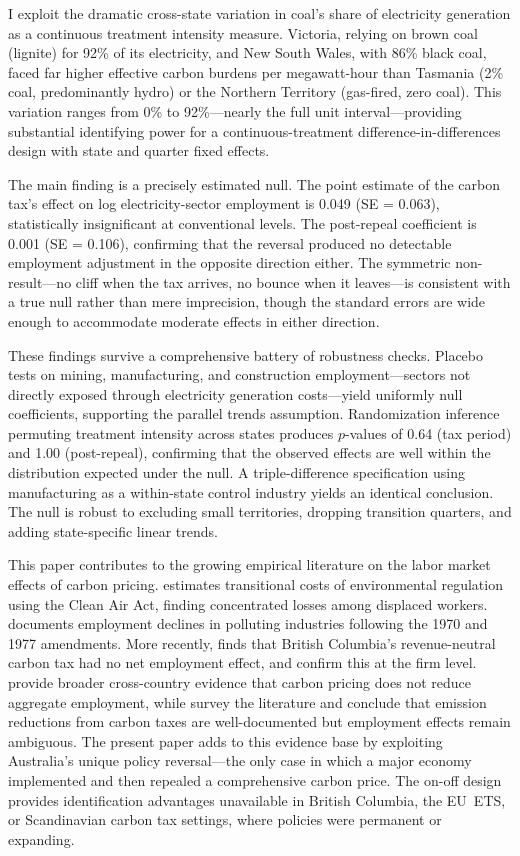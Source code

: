 \documentclass[12pt]{article}
\begin{document}
I exploit the dramatic cross-state variation in coal's share of electricity generation as a continuous treatment intensity measure. Victoria, relying on brown coal (lignite) for 92\% of its electricity, and New South Wales, with 86\% black coal, faced far higher effective carbon burdens per megawatt-hour than Tasmania (2\% coal, predominantly hydro) or the Northern Territory (gas-fired, zero coal). This variation ranges from 0\% to 92\%---nearly the full unit interval---providing substantial identifying power for a continuous-treatment difference-in-differences design with state and quarter fixed effects.

The main finding is a precisely estimated null. The point estimate of the carbon tax's effect on log electricity-sector employment is 0.049 (SE = 0.063), statistically insignificant at conventional levels. The post-repeal coefficient is 0.001 (SE = 0.106), confirming that the reversal produced no detectable employment adjustment in the opposite direction either. The symmetric non-result---no cliff when the tax arrives, no bounce when it leaves---is consistent with a true null rather than mere imprecision, though the standard errors are wide enough to accommodate moderate effects in either direction.

These findings survive a comprehensive battery of robustness checks. Placebo tests on mining, manufacturing, and construction employment---sectors not directly exposed through electricity generation costs---yield uniformly null coefficients, supporting the parallel trends assumption. Randomization inference permuting treatment intensity across states produces $p$-values of 0.64 (tax period) and 1.00 (post-repeal), confirming that the observed effects are well within the distribution expected under the null. A triple-difference specification using manufacturing as a within-state control industry yields an identical conclusion. The null is robust to excluding small territories, dropping transition quarters, and adding state-specific linear trends.

This paper contributes to the growing empirical literature on the labor market effects of carbon pricing. \citet{walker2013transitional} estimates transitional costs of environmental regulation using the Clean Air Act, finding concentrated losses among displaced workers. \citet{greenstone2002impact} documents employment declines in polluting industries following the 1970 and 1977 amendments. More recently, \citet{yamazaki2017jobs} finds that British Columbia's revenue-neutral carbon tax had no net employment effect, and \citet{azevedo2023carbon} confirm this at the firm level. \citet{metcalf2023unequal} provide broader cross-country evidence that carbon pricing does not reduce aggregate employment, while \citet{koppl2023carbon} survey the literature and conclude that emission reductions from carbon taxes are well-documented but employment effects remain ambiguous. The present paper adds to this evidence base by exploiting Australia's unique policy reversal---the only case in which a major economy implemented and then repealed a comprehensive carbon price. The on-off design provides identification advantages unavailable in British Columbia, the EU~ETS, or Scandinavian carbon tax settings, where policies were permanent or expanding.
\end{document}
